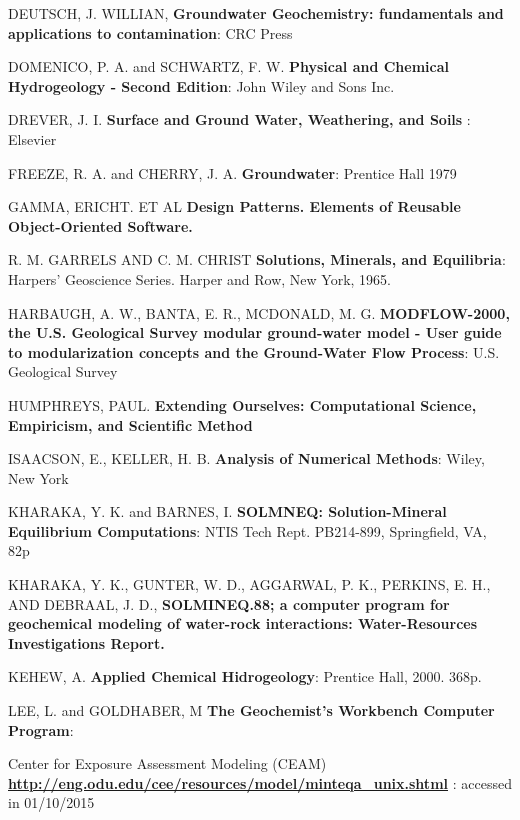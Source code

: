 \documentclass[ppgc,mestrado,English]{iiufrgs}
\begin{document}
\begin{thebibliography}{este-parametro-nao-eh-usado-pelo-estilo-ABNT}
 DEUTSCH, J. WILLIAN,
\textbf{Groundwater Geochemistry: fundamentals and applications to contamination}: CRC Press

 DOMENICO, P. A. and SCHWARTZ, F. W.
\textbf{Physical and Chemical Hydrogeology - Second Edition}: John Wiley and Sons Inc.

 DREVER, J. I.
\textbf{Surface and Ground Water, Weathering, and Soils} : Elsevier

 FREEZE, R. A. and CHERRY, J. A.
\textbf{Groundwater}: Prentice Hall 1979

 GAMMA, ERICHT. ET AL
\textbf{Design Patterns. Elements of Reusable Object-Oriented Software.}

 R. M. GARRELS AND C. M. CHRIST
\textbf{Solutions, Minerals, and Equilibria}: Harpers' Geoscience Series. Harper and Row, New York, 1965.

 HARBAUGH, A. W., BANTA, E. R., MCDONALD, M. G.
\textbf{MODFLOW-2000, the U.S. Geological Survey modular ground-water model - User guide to modularization concepts and the Ground-Water Flow Process}: U.S. Geological Survey

 HUMPHREYS, PAUL.
\textbf{Extending Ourselves: Computational Science, Empiricism, and Scientific Method}

 ISAACSON, E., KELLER, H. B.
\textbf{Analysis of Numerical Methods}: Wiley, New York 

 KHARAKA, Y. K. and BARNES, I.
\textbf{SOLMNEQ: Solution-Mineral Equilibrium Computations}: NTIS Tech Rept. PB214-899, Springfield, VA, 82p

 KHARAKA, Y. K., GUNTER, W. D., AGGARWAL, P. K., PERKINS, E. H., AND DEBRAAL, J. D.,
\textbf{SOLMINEQ.88; a computer program for geochemical modeling of water-rock interactions: Water-Resources Investigations Report.}

 KEHEW, A.
 \textbf{Applied Chemical Hidrogeology}: Prentice Hall, 2000. 368p.

 LEE, L. and GOLDHABER, M
\textbf{The Geochemist's Workbench Computer Program}: 

 Center for Exposure Assessment Modeling (CEAM)
\textbf{ \url{http://eng.odu.edu/cee/resources/model/minteqa_unix.shtml} } : accessed in 01/10/2015


\end{thebibliography}
\end{document}
